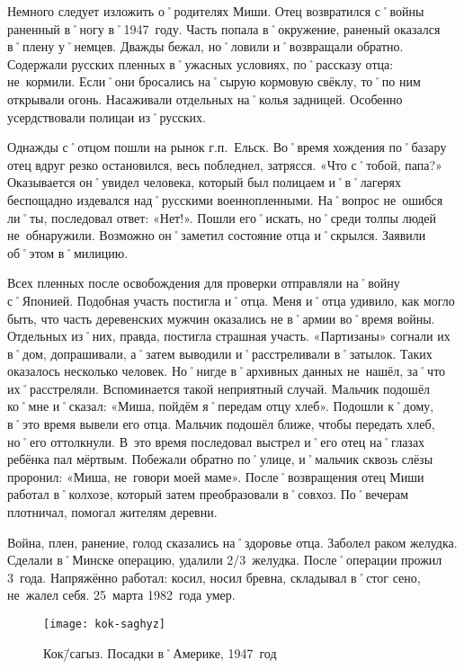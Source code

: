 Немного следует изложить о˚родителях Миши. Отец возвратился с˚войны раненный в˚ногу в˚1947~году. Часть попала в˚окружение, раненый оказался в˚плену у˚немцев. Дважды бежал, но˚ловили и˚возвращали обратно. Содержали русских пленных в˚ужасных условиях, по˚рассказу отца: не~кормили. Если˚они бросались на˚сырую кормовую свёклу, то˚по ним открывали огонь. Насаживали отдельных на˚колья задницей. Особенно усердствовали полицаи из˚русских. 

Однажды с˚отцом пошли на рынок г.п.~Ельск. Во˚время хождения по˚базару отец вдруг резко остановился, весь побледнел, затрясся. «Что с˚тобой, папа?» Оказывается он˚увидел человека, который был полицаем и˚в˚лагерях беспощадно издевался над˚русскими военнопленными. На˚вопрос не~ошибся ли˚ты, последовал ответ: «Нет!». Пошли его˚искать, но˚среди толпы людей не~обнаружили. Возможно он˚заметил состояние отца и˚скрылся. Заявили об˚этом в˚милицию.

Всех пленных после освобождения для проверки отправляли на˚войну с˚Японией. Подобная участь постигла и˚отца. Меня и˚отца удивило, как могло быть, что часть деревенских мужчин оказались не в˚армии во˚время войны. Отдельных из˚них, правда, постигла страшная участь. «Партизаны» согнали их в˚дом, допрашивали, а˚затем выводили и˚расстреливали в˚затылок. Таких оказалось несколько человек. Но˚нигде в˚архивных данных не~нашёл, за˚что их˚расстреляли. Вспоминается такой неприятный случай. Мальчик подошёл ко˚мне и˚сказал: «Миша, пойдём я˚передам отцу хлеб». Подошли к˚дому, в˚это время вывели его отца. Мальчик подошёл ближе, чтобы передать хлеб, но˚его оттолкнули. В~это время последовал выстрел и˚его отец на˚глазах ребёнка пал мёртвым. Побежали обратно по˚улице, и˚мальчик сквозь слёзы проронил: «Миша, не~говори моей маме». 
После˚возвращения отец Миши работал в˚колхозе, который затем преобразовали в˚совхоз. По˚вечерам плотничал, помогал жителям деревни.

Война, плен, ранение, голод сказались на˚здоровье отца. Заболел раком желудка. Сделали в˚Минске операцию, удалили 2/3~желудка. После˚операции прожил 3~года. Напряжённо работал: косил, носил бревна, складывал в˚стог сено, не~жалел себя. 25~марта 1982~года умер.

\begin{wrapfigure}{O}{.4\textwidth}
\centering
\texttt{[image: kok-saghyz]}
\caption[Кок\=/сагыз. Посадки в˚Америке, 1947~год]{Кок\=/сагыз. Посадки в˚Америке, 1947~год\footnotemark}
\label{fig:kok-saghyz}
\end{wrapfigure}

